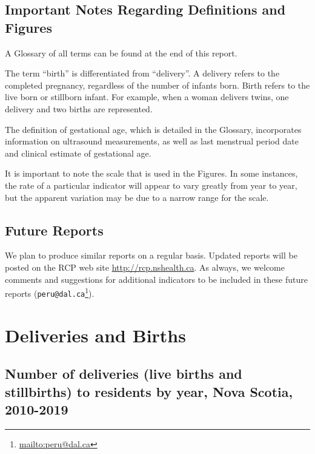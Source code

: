 \documentclass[
]{krantz}
\renewcommand{\href}[2]{#2\footnote{\url{#1}}}
\begin{document}
\hypertarget{important-notes-regarding-definitions-and-figures}{%
\section*{Important Notes Regarding Definitions and Figures}\label{important-notes-regarding-definitions-and-figures}}


A Glossary of all terms can be found at the end of this report.

The term ``birth'' is differentiated from ``delivery''. A delivery refers to the completed pregnancy, regardless of the number of infants born. Birth refers to the live born or stillborn infant. For example, when a woman delivers
twins, one delivery and two births are represented.

The definition of gestational age, which is detailed in the Glossary, incorporates information on ultrasound measurements, as well as last menstrual period date and clinical estimate of gestational age.

It is important to note the scale that is used in the Figures. In some instances, the rate of a particular indicator will appear to vary greatly from year to year, but the apparent variation may be due to a narrow range for the
scale.

\hypertarget{future-reports}{%
\section*{Future Reports}\label{future-reports}}


We plan to produce similar reports on a regular basis. Updated reports will be posted on the RCP web site \url{http://rcp.nshealth.ca}. As always, we welcome comments and suggestions for additional indicators to be
included in these future reports (\href{mailto:peru@dal.ca}{\nolinkurl{peru@dal.ca}}).

\mainmatter

\hypertarget{section-1}{%
\chapter{Deliveries and Births}\label{section-1}}

\hypertarget{section-11}{%
\section{Number of deliveries (live births and stillbirths) to residents by year, Nova Scotia, 2010-2019}\label{section-11}}
\end{document}
